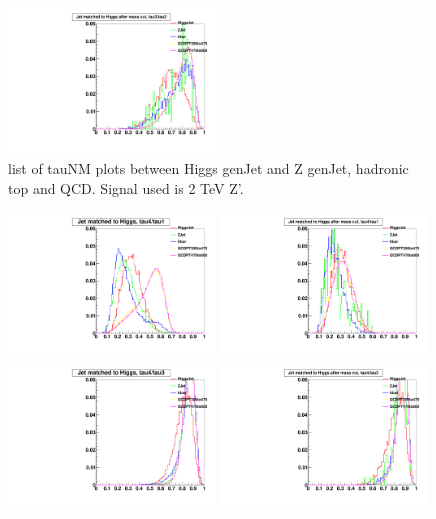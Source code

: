 \begin{figure}[h!tpb]
\begin{center}
\includegraphics[width=0.49\textwidth]{HqqqqZqqfigs/tauNM/Tau32After.pdf}
\end{center}
\caption{
list of tauNM plots between Higgs genJet and Z genJet, hadronic top and QCD.
Signal used is 2 TeV Z'.  
}
\label{fig:tauNM1}
\end{figure}

\begin{figure}[h!tpb]
\begin{center}
\includegraphics[width=0.49\textwidth]{HqqqqZqqfigs/tauNM/Tau41Pre.pdf}
\includegraphics[width=0.49\textwidth]{HqqqqZqqfigs/tauNM/Tau41After.pdf}
\includegraphics[width=0.49\textwidth]{HqqqqZqqfigs/tauNM/Tau43Pre.pdf}
\includegraphics[width=0.49\textwidth]{HqqqqZqqfigs/tauNM/Tau43After.pdf}

\end{center}
\end{figure}
